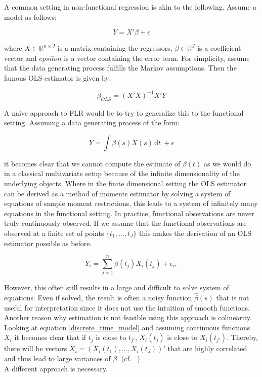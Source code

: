 \documentclass[11pt,twoside,a4paper]{article}
\begin{document}
	A common setting in non-functional regression is akin to the following. Assume a model as follows:
	
	\begin{equation}
		Y = X'\beta + \epsilon
	\end{equation}

	where $X \in \mathbb{R}^{n\times J}$ is a matrix containing the regressors, $\beta \in \mathbb{R}^J$ is a coefficient vector and $epsilon$ is a vector containing the error term. For simplicity, assume that the data generating process fulfills the Markov assumptions. Then the famous OLS-estimator is given by:
	
	\begin{equation}
		\hat{\beta}_{OLS} = (X'X)^{-1}X'Y
	\end{equation}

	A naive approach to FLR would be to try to generalize this to the functional setting.
	Assuming a data generating process of the form:
	
	\begin{equation}
    	 Y =  \int \beta(s)X(s) \,\mathrm{d}t \ +\epsilon
    \end{equation}

    it becomes clear that we cannot compute the estimate of $\beta(t)$ as we would do in a classical multivariate setup because of the infinite dimensionality of the underlying objects. Where in the finite dimensional setting the OLS estimator can be derived as a method of moments estimator by solving a system of equations of sample moment restrictions, this leads to a system of infinitely many equations in the functional setting. 
    In practice, functional observations are never truly continuously observed. If we assume that the functional observations are observed at a finite set of points $\{t_1, \dots, t_J\}$ this makes the derivation of an OLS estimator possible as before.
    
    \begin{equation}\label{discrete_time_model}
    	Y_i = \sum_{j = 1}^{n} \beta(t_{j})X_i(t_{j}) + \epsilon_{i},
    \end{equation}

    However, this often still results in a large and difficult to solve system of equations. Even if solved, the result is often a noisy function $\hat{\beta}(s)$ that is not useful for interpretation since it does not use the intuition of smooth functions. Another reason why estimation is not feasible using this approach is colinearity.
    Looking at equation \ref{discrete_time_model} and assuming continuous functions $X_i$ it becomes clear that if $t_{j}$ is close to $t_{j'}$, $X_{i}(t_{j})$ is close to $X_{i}(t_{j'})$. Thereby, there will be vectors $X_{i} = (X_i(t_1), \dots, X_i(t_J))'$ that are highly correlated and thus lead to large variances of $\beta$. (cf. ~\cite{kokoszka_introduction_2017})\\
    A different approach is necessary.
    
\end{document}
